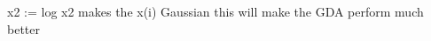\begin{answer}
	x2 := log x2 makes the x(i) Gaussian this will make the GDA perform much better
\end{answer}
